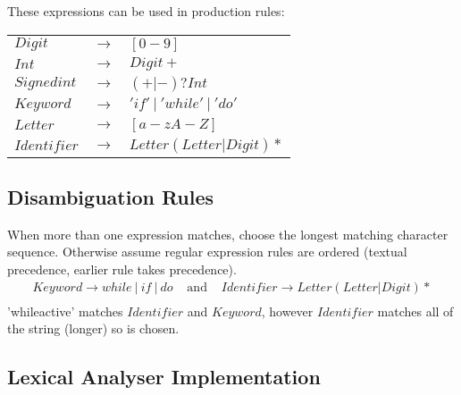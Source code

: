 \documentclass{report}
\begin{document}
            These expressions can be used in production rules:
            \begin{center}
                \begin{tabular}{l c l}
                    $Digit$&$\to$ & $[0-9]$ \\
                    $Int$&$\to$ & $Digit +$ \\
                    $Signedint$&$\to$ & $(+|-)? Int$ \\
                    $Keyword$ & $\to$ & $'if' \ | \ 'while' \ | \ 'do'$ \\
                    $Letter$ & $\to$ & $[a-zA-Z]$ \\
                    $Identifier$ & $\to$ & $Letter (Letter | Digit) *$ \\
                \end{tabular}
            \end{center}
        \subsection*{Disambiguation Rules}
            When more than one expression matches, choose the longest matching character sequence. Otherwise assume regular expression rules are ordered (textual precedence, earlier rule takes precedence).
            \[\begin{matrix}
                Keyword \to while \ | \ if \ | \ do & \text{ and } & Identifier \to Letter (Letter | Digit) * \\
            \end{matrix}\]
            'whileactive' matches $Identifier$ and $Keyword$, however $Identifier$ matches all of the string (longer) so is chosen.
        
        \subsection*{Lexical Analyser Implementation}
        
\end{document}
